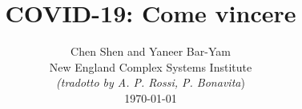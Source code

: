 \documentclass[onecolumn,journal]{IEEEtran}
\begin{document}
\title{\color{Brown} COVID-19: Come vincere \\
\vspace{-0.35ex}}
\author{Chen Shen and Yaneer Bar-Yam \\ New England Complex Systems Institute \\
\vspace{+0.35ex}
\small{\textit{(tradotto by A. P. Rossi, P. Bonavita})}\\
 \today
  \vspace{-14ex} \\


\bigskip
\bigskip

\textbf{}
 }

\maketitle


\flushbottom %



\thispagestyle{empty} %




\renewcommand{\thefootnote}{\fnsymbol{footnote}}
\end{document}
